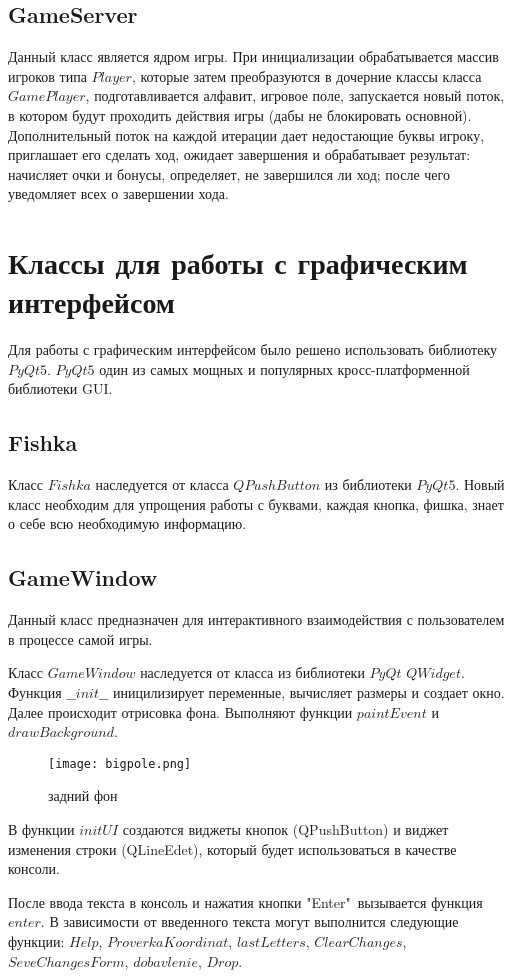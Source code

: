 \documentclass[a4paper,14pt]{article}
\begin{document}
	\subsection{GameServer}
	Данный класс является ядром игры. При инициализации обрабатывается массив игроков типа $Player$, которые затем преобразуются в дочерние классы класса $GamePlayer$, подготавливается алфавит, игровое поле, запускается новый поток, в котором будут проходить действия игры (дабы не блокировать основной). Дополнительный поток на каждой итерации дает недостающие буквы игроку, приглашает его сделать ход, ожидает завершения и обрабатывает результат: начисляет очки и бонусы, определяет, не завершился ли ход; после чего уведомляет всех о завершении хода.

	
\section{Классы для работы с графическим интерфейсом}
Для работы с графическим интерфейсом было решено использовать библиотеку $PyQt5$. $PyQt5$ один из самых мощных и популярных кросс-платформенной библиотеки GUI.
	\subsection{Fishka}
	Класс $Fishka$ наследуется от класса $QPushButton$ из библиотеки $PyQt5$. Новый класс необходим для упрощения работы с буквами, каждая кнопка, фишка, знает о себе всю необходимую информацию.
	\subsection{GameWindow}
	Данный класс предназначен для интерактивного взаимодействия с пользователем в процессе самой игры.
	
	Класс $GameWindow$ наследуется от класса из библиотеки $PyQt$ $QWidget$.	
	Функция $\_\_init\_\_$  иницилизирует переменные, вычисляет размеры и создает окно.	
	Далее происходит отрисовка фона. Выполняют функции $paintEvent$ и $drawBackground$.
	\begin{figure}[H]
		\centering
		\texttt{[image: bigpole.png]}
		\caption{задний фон}
	\end{figure}
		
	В функции $initUI$ создаются виджеты кнопок (QPushButton) и виджет изменения строки (QLineEdet), который будет использоваться в качестве консоли.
		
	После ввода текста в консоль и нажатия кнопки "Enter"\ вызывается функция $enter$.
	В зависимости от введенного текста могут выполнится следующие функции: $Help$, $ProverkaKoordinat$,  $lastLetters$,  $ClearChanges$, $SeveChangesForm$, $dobavlenie$, $Drop$.
	
\end{document}
